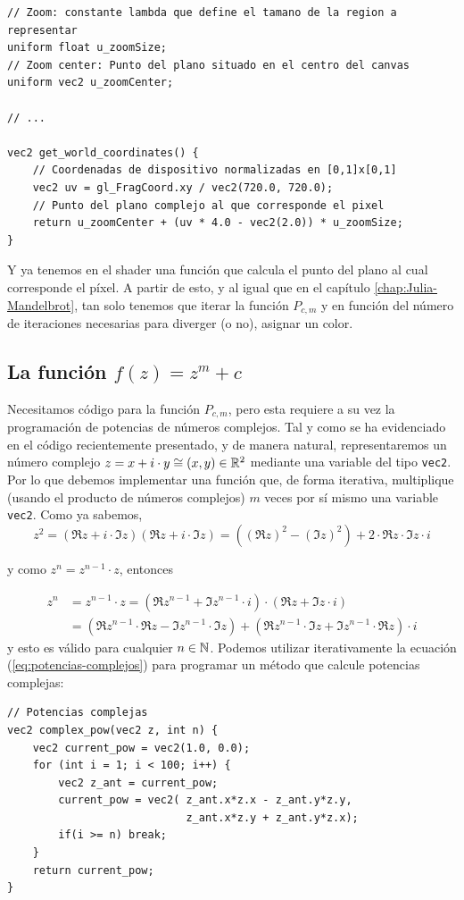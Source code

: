 \begin{lstlisting}
// Zoom: constante lambda que define el tamano de la region a representar
uniform float u_zoomSize;
// Zoom center: Punto del plano situado en el centro del canvas
uniform vec2 u_zoomCenter;

// ... 

vec2 get_world_coordinates() {
    // Coordenadas de dispositivo normalizadas en [0,1]x[0,1]
    vec2 uv = gl_FragCoord.xy / vec2(720.0, 720.0);
    // Punto del plano complejo al que corresponde el pixel
    return u_zoomCenter + (uv * 4.0 - vec2(2.0)) * u_zoomSize;
}
\end{lstlisting}

Y ya tenemos en el shader una función que calcula el punto del plano al cual corresponde el píxel. A partir de esto, y al igual que en el capítulo \ref{chap:Julia-Mandelbrot}, tan solo tenemos que iterar la función $P_{c,m}$ y en función del número de iteraciones necesarias para diverger (o no), asignar un color.

\subsection{La función $f(z)=z^m+c$}

Necesitamos código para la función $P_{c,m}$, pero esta requiere a su vez la programación de potencias de números complejos. Tal y como se ha evidenciado en el código recientemente presentado, y de manera natural, representaremos un número complejo $z=x+i\cdot y\cong (x,y)\in\mathbb{R}^2$ mediante una variable del tipo \verb|vec2|. Por lo que debemos implementar una función que, de forma iterativa, multiplique (usando el producto de números complejos) $m$ veces por sí mismo una variable \verb|vec2|. Como ya sabemos,
$$
z^2 = (\Re z+i\cdot \Im z)(\Re z+i\cdot \Im z) = ((\Re z)^2-(\Im z)^2) + 2\cdot\Re z\cdot\Im z\cdot i
$$

y como $z^n = z^{n-1}\cdot z$, entonces

\begin{equation}
    \label{eq:potencias-complejos}
    \begin{split}
        z^n & = z^{n-1}\cdot z = (\Re z^{n-1} + \Im z^{n-1}\cdot i)\cdot(\Re z + \Im z\cdot i) \\
        & = \left(\Re z^{n-1}\cdot\Re z - \Im z^{n-1}\cdot \Im z\right) + \left(\Re z^{n-1}\cdot\Im z + \Im z^{n-1}\cdot\Re z\right)\cdot i 
    \end{split}
\end{equation}
y esto es válido para cualquier $n\in\mathbb{N}$. Podemos utilizar iterativamente la ecuación (\ref{eq:potencias-complejos}) para programar un método que calcule potencias complejas:
\begin{lstlisting}
// Potencias complejas
vec2 complex_pow(vec2 z, int n) {
    vec2 current_pow = vec2(1.0, 0.0);
    for (int i = 1; i < 100; i++) {
        vec2 z_ant = current_pow;
        current_pow = vec2( z_ant.x*z.x - z_ant.y*z.y, 
                            z_ant.x*z.y + z_ant.y*z.x);
        if(i >= n) break;
    }
    return current_pow;
}
\end{lstlisting}

